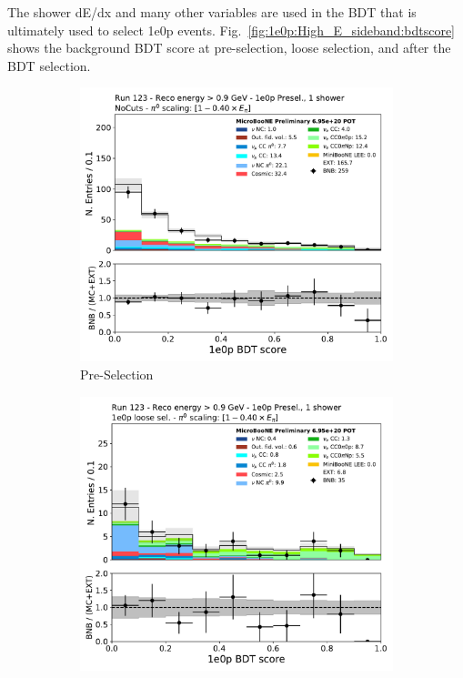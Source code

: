 The shower dE/dx and many other variables are used in the BDT that is ultimately used to select 1e0p events. 
Fig.~\ref{fig:1e0p:High_E_sideband:bdtscore} shows the background BDT score at pre-selection, loose selection, and after the BDT selection.  
\begin{figure}[H]
    \centering
    \begin{subfigure}{0.3\textwidth}
    \includegraphics[width=1.0\textwidth]{1e0p/High_E_Sideband/bkg_score.pdf}
    \caption{Pre-Selection}
    \end{subfigure}
    \begin{subfigure}{0.3\textwidth}
    \includegraphics[width=1.0\textwidth]{1e0p/High_E_Sideband/loose_selection/bkg_score.pdf}

\end{subfigure}
\end{figure}
